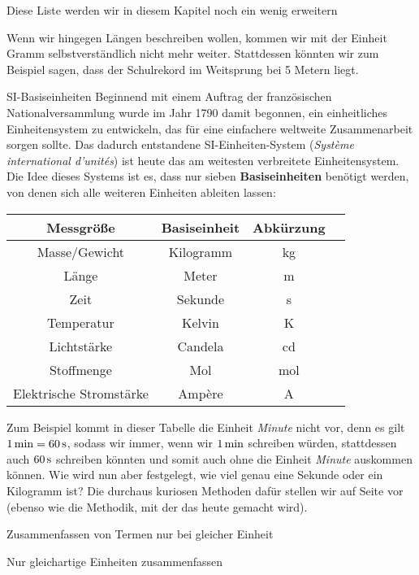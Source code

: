 \documentclass[../../main.tex]{subfiles}
\begin{document}
    Diese Liste werden wir in diesem Kapitel noch ein wenig erweitern

    Wenn wir hingegen Längen beschreiben wollen, kommen wir mit der Einheit Gramm selbstverständlich nicht mehr weiter. Stattdessen könnten wir zum Beispiel sagen, dass der Schulrekord im Weitsprung bei 5 Metern liegt.

    \begin{advanced}{SI-Basiseinheiten}
        Beginnend mit einem Auftrag der französischen Nationalversammlung wurde im Jahr 1790 damit begonnen, ein einheitliches Einheitensystem zu entwickeln, das für eine einfachere weltweite Zusammenarbeit sorgen sollte. Das dadurch entstandene SI-Einheiten-System (\emph{Système international d'unités}) ist heute das am weitesten verbreitete Einheitensystem. Die Idee dieses Systems ist es, dass nur sieben \textbf{Basiseinheiten} benötigt werden, von denen sich alle weiteren Einheiten ableiten lassen:
        \begin{center}
            \begin{tabular}{cccc}\toprule
                \textbf{Messgröße} & \textbf{Basiseinheit} & \textbf{Abkürzung}\\\midrule
                Masse/Gewicht & Kilogramm & kg\\
                Länge & Meter & m\\
                Zeit & Sekunde & s\\
                Temperatur & Kelvin & K\\
                Lichtstärke & Candela & cd\\
                Stoffmenge & Mol & mol\\
                Elektrische Stromstärke & Ampère & A\\
                \bottomrule
            \end{tabular}
        \end{center}
        Zum Beispiel kommt in dieser Tabelle die Einheit \emph{Minute} nicht vor, denn es gilt
        $1\minute=60\s$, sodass wir immer, wenn wir $1\minute$ schreiben würden, stattdessen auch $60\s$ schreiben könnten und somit auch ohne die Einheit \emph{Minute} auskommen können. Wie wird nun aber festgelegt, wie viel genau eine Sekunde oder ein Kilogramm ist? Die durchaus kuriosen Methoden dafür stellen wir auf Seite \pageref{si-units-history} vor (ebenso wie die Methodik, mit der das heute gemacht wird).
    \end{advanced}

    Zusammenfassen von Termen nur bei gleicher Einheit

    \begin{example}{Nur gleichartige Einheiten zusammenfassen}
    \end{example}
\end{document}
